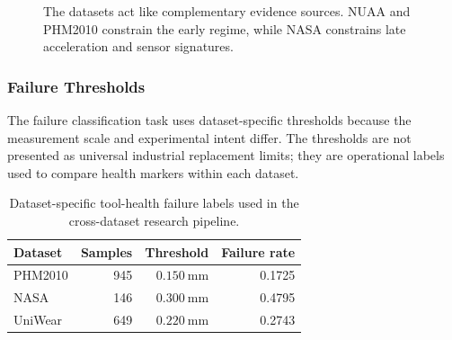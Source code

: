 \documentclass[11pt,a4paper]{article}
\begin{document}
\begin{figure}[!htbp]
  \centering
  \caption{The datasets act like complementary evidence sources. NUAA and PHM2010 constrain the early regime, while NASA constrains late acceleration and sensor signatures.}
  \label{fig:dataset-role-diagram}
\end{figure}

\subsubsection{Failure Thresholds}

The failure classification task uses dataset-specific thresholds because the measurement scale and experimental intent differ. The thresholds are not presented as universal industrial replacement limits; they are operational labels used to compare health markers within each dataset.

\begin{table}[!htbp]
  \centering
  \caption{Dataset-specific tool-health failure labels used in the cross-dataset research pipeline.}
  \label{tab:failure-thresholds}
  \small
  \begin{tabular}{lrrr}
    \toprule
    Dataset & Samples & Threshold & Failure rate \\
    \midrule
    PHM2010 & 945 & \(0.150~\mathrm{mm}\) & 0.1725 \\
    NASA & 146 & \(0.300~\mathrm{mm}\) & 0.4795 \\
    UniWear & 649 & \(0.220~\mathrm{mm}\) & 0.2743 \\
    \bottomrule
  \end{tabular}
\end{table}
\end{document}
